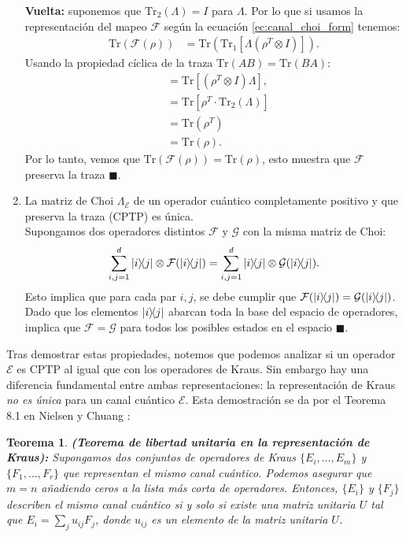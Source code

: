 \documentclass[letterpaper,12pt]{thesisECFM}
\theoremstyle{plain}
\newtheorem{thm}{Teorema}[section]
\theoremstyle{definition}
\theoremstyle{definition}
\theoremstyle{remark}
\newcommand{\1}{\mathbb{1}}
\begin{document}
\begin{enumerate}
    \textbf{Vuelta:} suponemos que $\text{Tr}_2(\Lambda) = I$ para $\Lambda$. Por lo que si usamos la representación del mapeo $\mathcal{F}$ según la ecuación \ref{ec:canal_choi_form} tenemos:
    \begin{align}
        \text{Tr} (\mathcal{F}(\rho)) &= \text{Tr}( \text{Tr}_1 [ \Lambda ( \rho^{T} \otimes I)]).
    \end{align}
    Usando la propiedad cíclica de la traza $\text{Tr}(AB) = \text{Tr}(BA)$:
    \begin{align}
        &= \text{Tr}[(\rho^T \otimes I) \Lambda], \\
        &= \text{Tr}[\rho^T \cdot \text{Tr}_2(\Lambda)]\\
        &= \text{Tr}(\rho^T)\\
        &=\text{Tr}(\rho).
    \end{align}
    Por lo tanto, vemos que $\text{Tr}(\mathcal{F}(\rho))= \text{Tr}(\rho)$, esto muestra que $\mathcal{F}$ preserva la traza $\blacksquare$.

    \item La matriz de Choi $\Lambda_{\mathcal{E}}$ de un operador cuántico completamente positivo y que preserva la traza (CPTP)  es única. \\
    Supongamos dos operadores distintos $\mathcal{F}$ y $\mathcal{G}$ con la misma matriz de Choi:
    \begin{equation}
       \sum_{i,j=1}^{d} \ketbra{i}{j} \otimes \mathcal{F}(\ketbra{i}{j}) =  \sum_{i,j=1}^{d} \ketbra{i}{j} \otimes \mathcal{G}(\ketbra{i}{j}).
    \end{equation}
    Esto implica que para cada par $i, j$, se debe cumplir que $\mathcal{F}(\ketbra{i}{j}) = \mathcal{G}(\ketbra{i}{j})$. Dado que los elementos $\ketbra{i}{j}$ abarcan toda la base del espacio de operadores, implica que $\mathcal{F} = \mathcal{G}$ para todos los posibles estados en el espacio $\blacksquare$.
\end{enumerate}

Tras demostrar estas propiedades, notemos  que podemos analizar si un operador $\mathcal{E}$ es CPTP al igual que con los operadores de Kraus. Sin embargo hay una diferencia fundamental entre ambas representaciones: la representación de Kraus \textit{no es única} para un canal cuántico $\mathcal{E}$.
Esta demostración se da por el Teorema 8.1 en Nielsen y Chuang \cite{nielsen_chuang_2011}:

\begin{thm}\textbf{(Teorema de libertad unitaria en la representación de Kraus):}  Supongamos dos conjuntos de operadores de Kraus $\{E_i, \ldots, E_m\}$ y $\{F_1, \ldots, F_r\}$ que representan el mismo canal cuántico. Podemos asegurar que $m = n$ añadiendo ceros a la lista más corta de operadores. Entonces, $\{E_i\}$ y $\{F_j\}$ describen el mismo canal cuántico si y solo si existe una matriz unitaria $U$ tal que $E_i = \sum_j u_{ij} F_j$, donde $u_{ij}$ es un elemento de la matriz unitaria $U$.
\end{thm}
\end{document}
